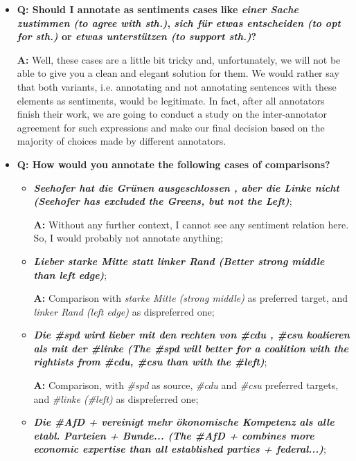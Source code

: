 \documentclass[11pt,a4paper]{article}
\begin{document}
\begin{itemize}
\item\textbf{Q: Should I annotate as sentiments cases like
  \textit{einer Sache zustimmen (to agree with sth.)}, \textit{sich
    f\"ur etwas entscheiden (to opt for sth.)} or \textit{etwas
    unterst\"utzen (to support sth.)}?}

  \textbf{A:} Well, these cases are a little bit tricky and,
  unfortunately, we will not be able to give you a clean and elegant
  solution for them.  We would rather say that both variants,
  i.e. annotating and not annotating sentences with these elements as
  sentiments, would be legitimate.  In fact, after all annotators
  finish their work, we are going to conduct a study on the
  inter-annotator agreement for such expressions and make our final
  decision based on the majority of choices made by different
  annotators.

\item\textbf{Q: How would you annotate the following cases of comparisons?}
  \begin{itemize}
  \item\textbf{\textit{Seehofer hat die Gr\"unen ausgeschlossen , aber
      die Linke nicht (Seehofer has excluded the Greens, but not the
      Left)}};

    \textbf{A:} Without any further context, I cannot see any
    sentiment relation here.  So, I would probably not annotate
    anything;

  \item\textbf{\textit{Lieber starke Mitte statt linker Rand (Better
      strong middle than left edge)}};

    \textbf{A:} Comparison with \textit{starke Mitte (strong middle)}
    as preferred target, and \textit{linker Rand (left edge)} as
    dispreferred one;

  \item\textbf{\textit{Die \#spd wird lieber mit den rechten von \#cdu
      , \#csu koalieren als mit der \#linke (The \#spd will better for
      a coalition with the rightists from \#cdu, \#csu than with the
      \#left)}};

    \textbf{A:} Comparison, with \textit{\#spd} as source,
    \textit{\#cdu} and \textit{\#csu} preferred targets, and
    \textit{\#linke (\#left)} as dispreferred one;

  \item\textbf{\textit{Die \#AfD + vereinigt mehr \"okonomische
      Kompetenz als alle etabl. Parteien + Bunde... (The \#AfD +
      combines more economic expertise than all established parties +
      federal...)}};


\end{itemize}
\end{itemize}
\end{document}
